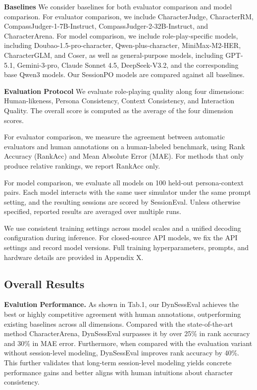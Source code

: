 \noindent\textbf{Baselines} 
We consider baselines for both evaluator comparison and model comparison. For evaluator comparison, we include CharacterJudge, CharacterRM, CompassJudger-1-7B-Instruct, CompassJudger-2-32B-Instruct, and CharacterArena. For model comparison, we include role-play-specific models, including Doubao-1.5-pro-character, Qwen-plus-character, MiniMax-M2-HER, CharacterGLM, and Coser, as well as general-purpose models, including GPT-5.1, Gemini-3-pro, Claude Sonnet 4.5, DeepSeek-V3.2, and the corresponding base Qwen3 models. Our SessionPO models are compared against all baselines.

\noindent\textbf{Evaluation Protocol} 
We evaluate role-playing quality along four dimensions: Human-likeness, Persona Consistency, Context Consistency, and Interaction Quality. The overall score is computed as the average of the four dimension scores.

For evaluator comparison, we measure the agreement between automatic evaluators and human annotations on a human-labeled benchmark, using Rank Accuracy (RankAcc) and Mean Absolute Error (MAE). For methods that only produce relative rankings, we report RankAcc only.

For model comparison, we evaluate all models on 100 held-out persona-context pairs. Each model interacts with the same user simulator under the same prompt setting, and the resulting sessions are scored by SessionEval. Unless otherwise specified, reported results are averaged over multiple runs.

We use consistent training settings across model scales and a unified decoding configuration during inference. For closed-source API models, we fix the API settings and record model versions. Full training hyperparameters, prompts, and hardware details are provided in Appendix X.





\subsection{Overall Results}


\textbf{Evalution Performance.}
As shown in Tab.1, our DynSessEval achieves the best or highly competitive agreement with human annotations, outperforming existing baselines across all dimensions. Compared with the state-of-the-art method CharacterArena, DynSessEval surpasses it by over 25\% in rank accuracy and 30\% in MAE error. Furthermore, when compared with the evaluation variant without session-level modeling, DynSessEval improves rank accuracy by 40\%. This further validates that long-term session-level modeling yields concrete performance gains and better aligns with human intuitions about character consistency.

